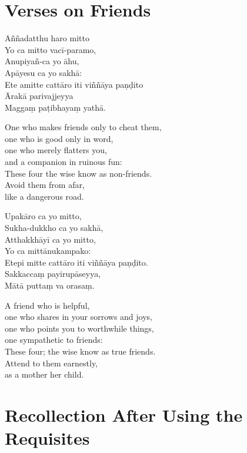 \section{Verses on Friends}


Aññadatthu haro mitto\\
Yo ca mitto vacī-paramo,\\
Anupiyañ-ca yo āhu,\\
Apāyesu ca yo sakhā:\\
Ete amitte cattāro iti viññāya paṇḍito\\
Ārakā parivajjeyya\\
Maggaṃ paṭibhayaṃ yathā.\\

\begin{english}
  One who makes friends only to cheat them,\\
  one who is good only in word,\\
  one who merely flatters you,\\
  and a companion in ruinous fun:\\
  These four the wise know as non-friends.\\
  Avoid them from afar,\\
  like a dangerous road.
\end{english}

Upakāro ca yo mitto,\\
Sukha-dukkho ca yo sakhā,\\
Atthakkhāyī ca yo mitto,\\
Yo ca mittānukampako:\\
Etepi mitte cattāro iti viññāya paṇḍito.\\
Sakkaccaṃ payirupāseyya,\\
Mātā puttaṃ va orasaṃ.

\begin{english}
  A friend who is helpful,\\
  one who shares in your sorrows and joys,\\
  one who points you to worthwhile things,\\
  one sympathetic to friends:\\
  These four; the wise know as true friends.\\
  Attend to them earnestly,\\
  as a mother her child.
\end{english}

\section{Recollection After Using the Requisites}
\label{recollection-after-using}

